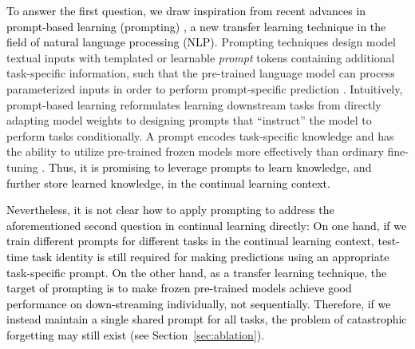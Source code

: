 \documentclass[10pt,twocolumn,letterpaper]{article}
\newcommand{\zifeng}[1]{\textcolor{black}{#1}}
\newcommand{\final}[1]{\textcolor{black}{#1}}
\begin{document}
\zifeng{
To answer the first question, we draw inspiration from recent advances in prompt-based learning (prompting) \cite{liu2021pre}, a new transfer learning technique in the field of natural language processing (NLP).
}
Prompting techniques design model textual inputs with templated or learnable \emph{prompt} tokens containing additional task-specific information, such that the pre-trained language model can process parameterized inputs in order to perform prompt-specific prediction \cite{lester2021power,shin2020autoprompt,li2021prefix}. 
Intuitively, prompt-based learning reformulates learning downstream tasks from directly adapting model weights to designing prompts that ``instruct'' the model to perform tasks conditionally. A prompt encodes task-specific knowledge and has the ability to utilize pre-trained frozen models more effectively than ordinary fine-tuning \cite{lester2021power,raffel2020exploring}. \zifeng{Thus, it is promising to leverage prompts to learn knowledge, \final{and further store learned knowledge,} in the continual learning context.}



\zifeng{
Nevertheless, it is not clear how to apply prompting to address the aforementioned second question  in continual learning directly: 
On one hand, if we train different prompts for different tasks in the continual learning context, test-time task identity is still required for making predictions using an appropriate task-specific prompt. On the other hand, as a transfer learning technique, the target of prompting is to make frozen pre-trained models achieve good performance on down-streaming individually, not sequentially. Therefore, if we instead maintain a single shared prompt for all tasks, the problem of catastrophic forgetting may still exist (see Section~\ref{sec:ablation}).
}
\end{document}
